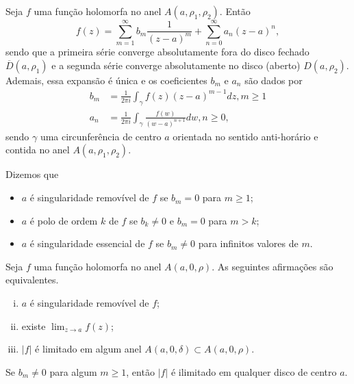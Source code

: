 \begin{teorema}
\label{teo-laurent}
Seja $f$ uma função holomorfa no anel $A(a, \rho_1, \rho_2)$. Então
\begin{equation*}
    f(z) = \sum_{m=1}^{\infty} b_m\frac{1}{(z-a)^m} + \sum_{n=0}^{\infty} a_n(z-a)^n,
\end{equation*}
sendo que a primeira série converge absolutamente fora do disco fechado $\overline{D}(a, \rho_1)$
e a segunda série converge absolutamente no disco (aberto) $D(a, \rho_2)$. 
Ademais, essa expansão é única e os coeficientes $b_m$ e $a_n$ são dados por
\begin{align*}
    b_m &= \frac{1}{2\pi i}\int_{\gamma} f(z)(z-a)^{m-1} dz, m\geq 1 \\
    a_n &= \frac{1}{2\pi i}\int_{\gamma} \frac{f(w)}{(w-a)^{n+1}} dw, n\geq 0,
\end{align*}
sendo $\gamma$ uma circunferência de centro $a$ orientada no sentido anti-horário 
e contida no anel $A(a, \rho_1, \rho_2)$.
\end{teorema}


\begin{definicao}
Dizemos que 
\begin{itemize}
    \item $a$ é singularidade removível de $f$ se $b_m = 0$ para $m\geq 1$;
    \item $a$ é polo de ordem $k$ de $f$ se $b_k\neq 0$ e $b_m = 0$ para $m>k$;
    \item $a$ é singularidade essencial de $f$ se $b_m\neq 0$ para infinitos valores de $m$.
\end{itemize}
\end{definicao}


\begin{proposicao}
Seja $f$ uma função holomorfa no anel $A(a, 0, \rho)$. As seguintes afirmações são equivalentes.
\begin{enumerate}[(i)]
    \item $a$ é singularidade removível de $f$;
    \item existe $\displaystyle{\lim_{z\to a} f(z)}$;
    \item $|f|$ é limitado em algum anel $A(a, 0, \delta) \subset A(a, 0, \rho)$.
\end{enumerate}
\end{proposicao}


\begin{corolario}
Se $b_m\neq 0$ para algum $m\geq 1$, então $|f|$ é ilimitado em qualquer disco de centro $a$.
\end{corolario}


